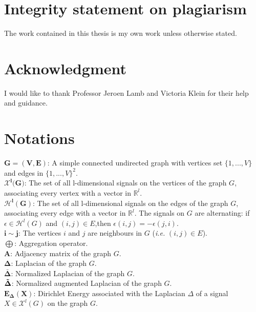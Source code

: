 \documentclass[12pt]{article}
\begin{document}
\newpage
\section*{\centering Integrity statement on plagiarism }
The work contained in this thesis is my own work unless otherwise stated.

\section*{\centering Acknowledgment}
I would like to thank Professor Jeroen Lamb and Victoria Klein for their help and guidance.

\newpage
\section*{\centering Notations}
$\mathbf{G = (V,E)}$: A simple connected undirected graph with vertices set $\{1,...,V\}$ and edges in $\{1,...,V\}^2$.\\

$\mathbf{\mathcal{X}^l(G})$: The set of all l-dimensional signals on the vertices of the graph $G$, associating every vertex with a vector in $\mathbb{R}^l$.\\

$\mathbf{\mathcal{H}^l(G)}$: The set of all l-dimensional signals on the edges of the graph $G$, associating every edge with a vector in $\mathbb{R}^l$. The signals on $G$ are alternating: if $\epsilon \in \mathcal{H}^l(G)$ and $(i,j) \in E$,then $\epsilon(i,j) = - \epsilon(j,i)$.\\

$\mathbf{i \sim j}$: The vertices $i$ and $j$ are neighbours in $G$ (\textit{i.e.} $(i,j) \in E$).\\

$\mathbf{\bigoplus}$: Aggregation operator.\\

$\mathbf{A}$: Adjacency matrix of the graph $G$.\\

$\mathbf{\Delta}$: Laplacian of the graph $G$.\\

$\mathbf{\bar{\Delta}}$: Normalized Laplacian of the graph $G$.\\

$\mathbf{\Tilde{\Delta}}$: Normalized augmented Laplacian of the graph $G$.\\

$\mathbf{E_{\Delta}(X)}$: Dirichlet Energy associated with the Laplacian $\Delta$ of a signal $X \in \mathcal{X}^l(G)$ on the graph $G$.\\
\end{document}
